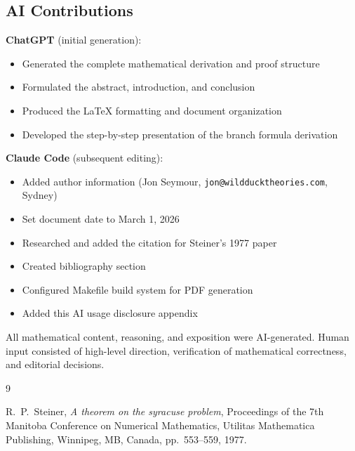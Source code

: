 \documentclass[12pt]{article}
\begin{document}
\subsection*{AI Contributions}

\textbf{ChatGPT} (initial generation):
\begin{itemize}
\item Generated the complete mathematical derivation and proof structure
\item Formulated the abstract, introduction, and conclusion
\item Produced the LaTeX formatting and document organization
\item Developed the step-by-step presentation of the branch formula derivation
\end{itemize}

\textbf{Claude Code} (subsequent editing):
\begin{itemize}
\item Added author information (Jon Seymour, \texttt{jon@wildducktheories.com}, Sydney)
\item Set document date to March 1, 2026
\item Researched and added the citation for Steiner's 1977 paper
\item Created bibliography section
\item Configured Makefile build system for PDF generation
\item Added this AI usage disclosure appendix
\end{itemize}

All mathematical content, reasoning, and exposition were AI-generated.
Human input consisted of high-level direction, verification of mathematical
correctness, and editorial decisions.

\begin{thebibliography}{9}

R.~P.~Steiner,
\emph{A theorem on the syracuse problem},
Proceedings of the 7th Manitoba Conference on Numerical Mathematics,
Utilitas Mathematica Publishing, Winnipeg, MB, Canada,
pp.~553--559, 1977.

\end{thebibliography}
\end{document}
